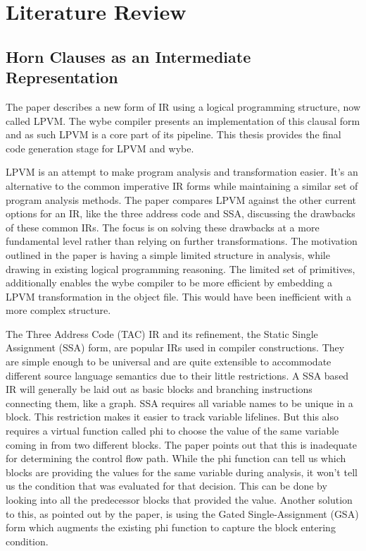 \chapter{Literature Review}


\section{Horn Clauses as an Intermediate Representation}

The paper describes a new form of IR using a logical programming structure, now
called LPVM. The wybe compiler presents an implementation of this clausal form
and as such LPVM is a core part of its pipeline. This thesis provides the final
code generation stage for LPVM and wybe.

LPVM is an attempt to make program analysis and transformation easier. It's an
alternative to the common imperative IR forms while maintaining a similar set
of program analysis methods. The paper compares LPVM against the other current
options for an IR, like the three address code and SSA, discussing the
drawbacks of these common IRs. The focus is on solving these drawbacks at a
more fundamental level rather than relying on further transformations. The
motivation outlined in the paper is having a simple limited structure in
analysis, while drawing in existing logical programming reasoning. The limited
set of primitives, additionally enables the wybe compiler to be more efficient
by embedding a LPVM transformation in the object file. This would have been
inefficient with a more complex structure.

The Three Address Code (TAC) IR and its refinement, the Static Single
Assignment (SSA) form, are popular IRs used in compiler constructions. They are
simple enough to be universal and are quite extensible to accommodate different
source language semantics due to their little restrictions. A SSA based IR will
generally be laid out as basic blocks and branching instructions connecting
them, like a graph. SSA requires all variable names to be unique in a
block. This restriction makes it easier to track variable lifelines. But this
also requires a virtual function called phi to choose the value of the same
variable coming in from two different blocks. The paper points out that this is
inadequate for determining the control flow path. While the phi function can
tell us which blocks are providing the values for the same variable during
analysis, it won't tell us the condition that was evaluated for that
decision. This can be done by looking into all the predecessor blocks that
provided the value. Another solution to this, as pointed out by the paper, is
using the Gated Single-Assignment (GSA) form which augments the existing phi
function to capture the block entering condition.

